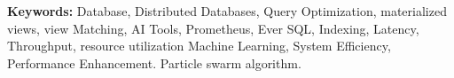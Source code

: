 
\noindent \textbf{Keywords:} Database, Distributed Databases, Query Optimization, materialized views, view Matching, AI Tools, Prometheus, Ever SQL, Indexing, Latency, Throughput, resource utilization Machine Learning, System Efficiency, Performance Enhancement. Particle swarm algorithm.

 

